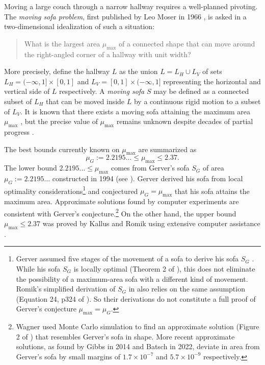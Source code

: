 Moving a large couch through a narrow hallway requires a well-planned pivoting. The \emph{moving sofa problem}, first published by Leo Moser in 1966 \autocite{moser1966problem}, is asked in a two-dimensional idealization of such a situation:

\begin{quote}
What is the largest area \(\mu_{\text{max}}\) of a connected shape that can move around the right-angled corner of a hallway with unit width?
\end{quote}

More precisely, define the hallway \(L\) as the union \(L = L_H \cup L_V\) of sets \(L_H = (-\infty, 1] \times [0, 1]\) and \(L_V = [0, 1] \times (-\infty, 1]\) representing the horizontal and vertical side of \(L\) respectively. A \emph{moving sofa} \(S\) may be defined as a connected subset of \(L_H\) that can be moved inside \(L\) by a continuous rigid motion to a subset of \(L_V\). It is known that there exists a moving sofa attaining the maximum area \(\mu_{\text{max}}\) \autocite{gerverMovingSofaCorner1992,croft2012unsolved}, but the precise value of \(\mu_{\text{max}}\) remains unknown despite decades of partial progress \autocite{hammersley1968enfeeblement,gerverMovingSofaCorner1992,romikDifferentialEquationsExact2018,kallusImprovedUpperBounds2018}.

The best bounds currently known on \(\mu_{\max}\) are summarized as
\begin{equation}
\label{eqn:best-bounds}
\mu_G := 2.2195\dots \leq \mu_{\max} \leq 2.37.
\end{equation}
The lower bound \(2.2195\dots \leq \mu_{\max}\) comes from Gerver’s sofa \(S_G\) of area \(\mu_G :=
2.2195\dots\) constructed in 1994 \autocite{gerverMovingSofaCorner1992} (see ).
Gerver derived his sofa from local optimality considerations\footnote{Gerver assumed five stages of
the movement of a sofa to derive his sofa \(S_G\) \autocite{gerverMovingSofaCorner1992}. While his
sofa \(S_G\) is locally optimal (Theorem 2 of \autocite{gerverMovingSofaCorner1992}), this does not
eliminate the possibility of a maximum-area sofa with a different kind of movement. Romik’s
simplified derivation of \(S_G\) in \autocite{romikDifferentialEquationsExact2018} also relies on
the same assumption (Equation 24, p324 of \autocite{romikDifferentialEquationsExact2018}). So their
derivations do not constitute a full proof of Gerver’s conjecture \(\mu_{\max} = \mu_G\).} and
conjectured \(\mu_G = \mu_{\max}\) that his sofa attains the maximum area. Approximate solutions
found by computer experiments are consistent with Gerver’s conjecture.\footnote{Wagner used Monte
Carlo simulation to find an approximate solution (Figure 2 of \autocite{wagner1976sofa}) that
resembles Gerver’s sofa in shape. More recent approximate solutions, as found by Gibbs
\autocite{gibbsComputationalStudySofas2014} in 2014 and Batsch \autocite{batschNumericalApproachAnalysing2022} in 2022, deviate in area from Gerver’s sofa by small margins of \(1.7 \times 10^{-7}\) and \(5.7 \times 10^{-9}\) respectively.} On the other hand, the upper bound \(\mu_{\max} \leq 2.37\) was proved by Kallus and Romik using extensive computer assistance \autocite{kallusImprovedUpperBounds2018}.

